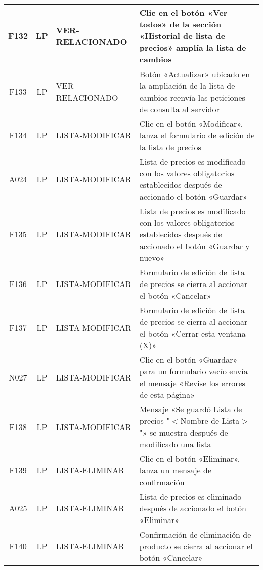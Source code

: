 \begin{landscape}
{\begin{longtable}[htb]{|c|c|p{3.8cm}|p{15.2cm}|}
\scriptsize{F132} & \scriptsize{LP} & \scriptsize{VER-RELACIONADO} & \scriptsize{Clic en el botón «Ver todos» de la sección «Historial de lista de precios» amplía la lista de cambios} \\ \hline
\scriptsize{F133} & \scriptsize{LP} & \scriptsize{VER-RELACIONADO} & \scriptsize{Botón «Actualizar» ubicado en la ampliación de la lista de cambios reenvía las peticiones de consulta al servidor} \\ \hline
\scriptsize{F134} & \scriptsize{LP} & \scriptsize{LISTA-MODIFICAR} & \scriptsize{Clic en el botón «Modificar», lanza el formulario de edición de la lista de precios} \\ \hline
\scriptsize{A024} & \scriptsize{LP} & \scriptsize{LISTA-MODIFICAR} & \scriptsize{Lista de precios es modificado con los valores obligatorios establecidos después de accionado el botón «Guardar»} \\ \hline
\scriptsize{F135} & \scriptsize{LP} & \scriptsize{LISTA-MODIFICAR} & \scriptsize{Lista de precios es modificado con los valores obligatorios establecidos después de accionado el botón «Guardar y nuevo»} \\ \hline
\scriptsize{F136} & \scriptsize{LP} & \scriptsize{LISTA-MODIFICAR} & \scriptsize{Formulario de edición de lista de precios se cierra al accionar el botón «Cancelar»} \\ \hline
\scriptsize{F137} & \scriptsize{LP} & \scriptsize{LISTA-MODIFICAR} & \scriptsize{Formulario de edición de lista de precios se cierra al accionar el botón «Cerrar esta ventana (X)»} \\ \hline
\scriptsize{N027} & \scriptsize{LP} & \scriptsize{LISTA-MODIFICAR} & \scriptsize{Clic en el botón «Guardar» para un formulario vacío envía el mensaje «Revise los errores de esta página»} \\ \hline
\scriptsize{F138} & \scriptsize{LP} & \scriptsize{LISTA-MODIFICAR} & \scriptsize{Mensaje «Se guardó Lista de precios "$<$Nombre de Lista$>$"» se muestra después de modificado una lista} \\ \hline
\scriptsize{F139} & \scriptsize{LP} & \scriptsize{LISTA-ELIMINAR} & \scriptsize{Clic en el botón «Eliminar», lanza un mensaje de confirmación} \\ \hline
\scriptsize{A025} & \scriptsize{LP} & \scriptsize{LISTA-ELIMINAR} & \scriptsize{Lista de precios es eliminado después de accionado el botón «Eliminar»} \\ \hline
\scriptsize{F140} & \scriptsize{LP} & \scriptsize{LISTA-ELIMINAR} & \scriptsize{Confirmación de eliminación de producto se cierra al accionar el botón «Cancelar»} \\ \hline

\end{longtable}}
\end{landscape}
